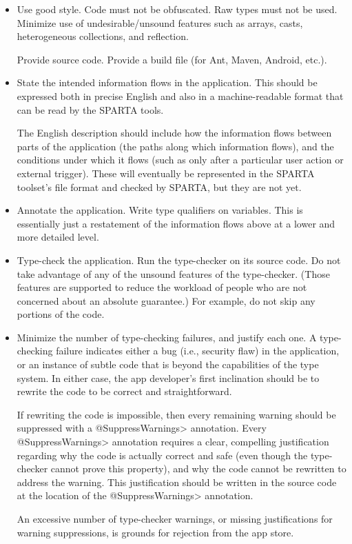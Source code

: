 \begin{itemize}
\item
  Use good style.  Code must not be obfuscated.  Raw types must not be
  used.  Minimize use of undesirable/unsound features such as arrays,
  casts, heterogeneous collections, and reflection.

  Provide source code.  Provide a build file (for Ant, Maven, Android,
  etc.).

\item
  State the intended information flows in the application.  This should
  be expressed both in precise English and also in a machine-readable
  format that can be read by the SPARTA tools.

  The English description should include how the information flows between
  parts of the application (the paths along which information flows), and
  the conditions under which it flows (such as only after a particular user
  action or external trigger).  These will eventually be represented in the
  SPARTA toolset's file format and checked by SPARTA, but they are not yet.

\item
  Annotate the application.  Write type qualifiers on variables.  This is
  essentially just a restatement of the information flows above at a lower
  and more detailed level.

\item
  Type-check the application.  Run the type-checker on its source code.  Do
  not take advantage of any of the unsound features of the type-checker.
  (Those features are supported to reduce the workload of people who are
  not concerned about an absolute guarantee.)  For example, do not skip any
  portions of the code.

\item
  Minimize the number of type-checking failures, and justify each one.  A
  type-checking failure indicates either a bug (i.e., security flaw) in the
  application, or an instance of subtle code that is beyond the
  capabilities of the type system.  In either case, the app developer's
  first inclination should be to rewrite the code to be correct and
  straightforward.

  If rewriting the code is impossible, then every remaining warning should
  be suppressed with a \<@SuppressWarnings> annotation.  Every
  \<@SuppressWarnings> annotation requires a clear, compelling
  justification regarding why the code is actually correct and safe (even
  though the type-checker cannot prove this property), and why the code
  cannot be rewritten to address the warning.  This justification should be
  written in the source code at the location of the \<@SuppressWarnings>
  annotation.

  An excessive number of type-checker warnings, or missing justifications
  for warning suppressions, is grounds for rejection from the app store.

\end{itemize}




